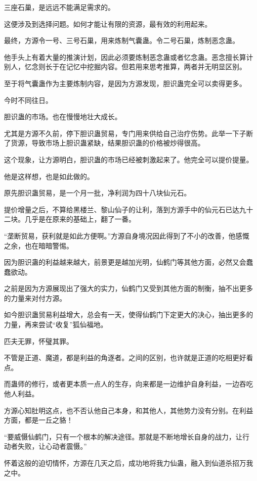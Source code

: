 \begin{this_body}
三座石巢，是远远不能满足需求的。

这便涉及到选择问题。如何才能让有限的资源，最有效的利用起来。

最终，方源令一号、三号石巢，用来炼制气囊蛊。令二号石巢，炼制恶念蛊。

他手头上有着大量的推演计划，因此必须要炼制恶念蛊或者忆念蛊。恶念擅长算计别人，忆念则长于在记忆中挖掘内容。但若用来思考推算，两者并无明显区别。

至于将气囊蛊作为主要炼制内容，是因为方源发现，胆识蛊完全可以卖得更多。

今时不同往日。

胆识蛊的市场。也在慢慢地壮大成长。

尤其是方源不久前，停下胆识蛊贸易，专门用来供给自己治疗伤势。此举一下子断了货源，导致市场上胆识蛊紧缺，结果胆识蛊的价格被炒得很高。

这个现象，让方源明白，胆识蛊的市场已经被刺激起来了。他完全可以提价提量。

他是这样想，也是如此做的。

原先胆识蛊贸易，是一个月一批，净利润为四十八块仙元石。

提价增量之后，不算给黑楼兰、黎山仙子的让利，落到方源手中的仙元石已达九十二块。几乎是在原来的基础上，翻了一番。

“垄断贸易，获利就是如此方便啊。”方源自身境况因此得到了不小的改善，他感慨之余，也在暗暗警惕。

因为胆识蛊的利益越来越大，前景更是越加光明，仙鹤门等其他方面，必然又会蠢蠢欲动。

之前是因为方源展现出了强大的实力，仙鹤门又受到其他方面的制衡，抽不出更多的力量来对付方源。

如今胆识蛊贸易利益增大，总会有一天，使得仙鹤门下定更大的决心，抽出更多的力量，再来尝试“收复”狐仙福地。

匹夫无罪，怀璧其罪。

不管是正道、魔道，都是利益的角逐者。之间的区别，也许就是正道的吃相更好看点。

而蛊师的修行，或者更本质一点人的生存，向来都是一边维护自身利益，一边吞吃他人利益。

方源心知肚明这点，也不否认他自己本身，和其他人，其他势力没有分别。在利益方面，都是一丘之貉！

“要威慑仙鹤门，只有一个根本的解决途径。那就是不断地增长自身的战力，让行动者失败，让心动者震慑。”

怀着这般的迫切情怀，方源在几天之后，成功地将我力仙蛊，融入到仙道杀招万我之中。


\end{this_body}
